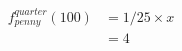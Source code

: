 \vbox{
  \begin{align*}
    {f_{penny}^{quarter}}(100)  & = 1/25 \times x \\
                                & = 4
  \end{align*}
}
